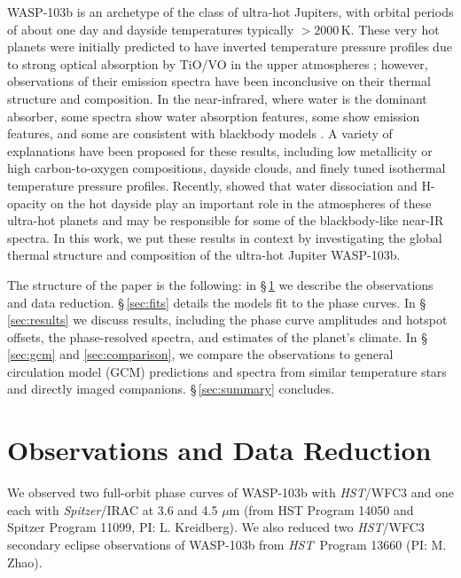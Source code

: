 \documentclass[twocolumn]{aastex61}
\newcommand{\project}[1]{\textsl{#1}}
\newcommand{\HST}{\project{HST}}
\newcommand{\Spitzer}{\project{Spitzer}}
\begin{document}
WASP-103b is an archetype of the class of ultra-hot Jupiters, with orbital periods of about one day and dayside temperatures typically $>2000\,\mathrm{K}$. These very hot planets were initially predicted to have inverted temperature pressure profiles due to strong optical absorption by TiO/VO in the upper atmospheres \citep{hubeny03, fortney08}; however, observations of their emission spectra have been inconclusive on their thermal structure and composition. In the near-infrared, where water is the dominant absorber, some spectra show water absorption features, some show emission features, and some are consistent with blackbody models \citep{madhusudhan11, crossfield12, stevenson14b, haynes15, evans16, beatty17a, beatty17b, sheppard17, arcangeli18, mansfield18}.  A variety of explanations have been proposed for these results, including low metallicity or high carbon-to-oxygen compositions, dayside clouds, and finely tuned isothermal temperature pressure profiles. Recently, \cite{arcangeli18} showed that water dissociation and H- opacity on the hot dayside play an important role in the atmospheres of these ultra-hot planets and may be responsible for some of the blackbody-like near-IR spectra. In this work, we put these results in context by investigating the global thermal structure and composition of the ultra-hot Jupiter WASP-103b.

The structure of the paper is the following: in \S\,\ref{sec:observations} we describe the observations and data reduction. \S\,\ref{sec:fits} details the models fit to the phase curves. In \S\,\ref{sec:results} we discuss results, including the phase curve amplitudes and hotspot offsets, the phase-resolved spectra, and estimates of the planet's climate. In \S\,\ref{sec:gcm} and \ref{sec:comparison}, we compare the observations to general circulation model (GCM) predictions and spectra from similar temperature stars and directly imaged companions. \S\,\ref{sec:summary} concludes.




\section{Observations and Data Reduction}
\label{sec:observations}
We observed two full-orbit phase curves of WASP-103b with \HST/WFC3 and one each with \Spitzer/IRAC at 3.6 and 4.5 $\mu$m (from HST Program 14050 and Spitzer Program 11099, PI: L. Kreidberg). We also reduced two \HST/WFC3 secondary eclipse observations of WASP-103b from \HST\ Program 13660 (PI: M. Zhao).
\end{document}
